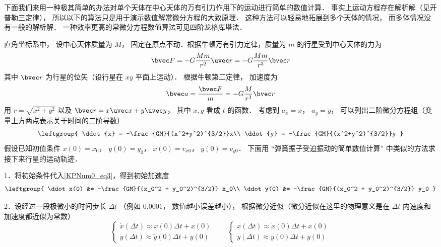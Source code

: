 

下面我们来用一种极其简单的办法对单个天体在中心天体的万有引力作用下的运动进行简单的数值计算． 事实上运动方程存在解析解（见开普勒三定律）， 所以以下的算法只是用于演示数值解常微分方程的大致原理． 这种方法可以轻易地拓展到多个天体的情况， 而多体情况没有一般的解析解． 一种效率更高的常微分方程数值算法可见四阶龙格库塔法．

直角坐标系中， 设中心天体质量为 $M$， 固定在原点不动．根据牛顿万有引力定律，质量为 $m$ 的行星受到中心天体的力为
\begin{equation}
\bvec F = -G \frac{Mm}{r^2}\uvec r = -G\frac{Mm}{r^3} \bvec r
\end{equation}
其中 $\bvec r$ 为行星的位矢（设行星在 $xy$ 平面上运动）． 根据牛顿第二定律， 加速度为
\begin{equation}
\bvec a = \frac{\bvec F}{m} = -G\frac{M}{r^3} \bvec r
\end{equation}
用 $r = \sqrt{x^2+y^2}$ 以及 $\bvec r = x\uvec x + y\uvec y$， 其中 $x,y$ 看成 $t$ 的函数． 考虑到 $a_x = \ddot x$， $a_y = \ddot y$， 可以列出二阶微分方程组（变量上方两点表示关于时间的二阶导数）
\begin{equation}\label{KPNum0_eq3}
\leftgroup{
\ddot{x} = -\frac{GM}{(x^2+y^2)^{3/2}}x\\
\ddot{y} = -\frac{GM}{(x^2+y^2)^{3/2}}y
}\end{equation}
假设已知初值条件 $x(0) = x_0$， $y(0) = y_0$， $\dot x(0) = v_{x0}$， $\dot y(0) = v_{y0}$． 下面用 “弹簧振子受迫振动的简单数值计算” 中类似的方法求接下来行星的运动轨迹．

1．将初始条件代入\autoref{KPNum0_eq3}，得到初始加速度
\begin{equation}
\leftgroup{
\ddot x(0) &= -\frac{GM}{(x_0^2 + y_0^2)^{3/2}} x_0\\
\ddot y(0) &= -\frac{GM}{(x_0^2 + y_0^2)^{3/2}} y_0
}
\end{equation}
 
2．设经过一段极微小的时间步长 $\Delta t$ （例如 $0.0001$， 数值越小误差越小）， 根据微分近似（微分近似在这里的物理意义是在 $\Delta t$ 内速度和加速度都近似为常数）
\begin{equation}
\begin{cases}
\dot x(\Delta t) \approx \ddot x(0)\Delta t + x(0)\\
\dot y(\Delta t) \approx \ddot y(0)\Delta t + \dot y(0)
\end{cases}
\qquad
\begin{cases}
x(\Delta t) \approx \dot x(0)\Delta t + x(0)\\
y(\Delta t) \approx \dot y(0)\Delta t + y(0)
\end{cases}
\end{equation}

